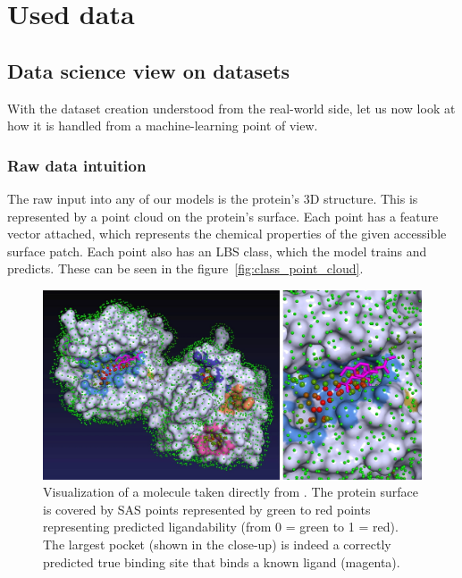 \chapter{Used data}

\section{Data science view on datasets}

With the dataset creation understood from the real-world side, let us now look at how it is handled from a machine-learning point of view. 

\subsection{Raw data intuition}

The raw input into any of our models is the protein's 3D structure. This is represented by a point cloud on the protein's surface. Each point has a feature vector attached, which represents the chemical properties of the given accessible surface patch. Each point also has an LBS class, which the model trains and predicts. These can be seen in the figure~\ref{fig:class_point_cloud}.

\begin{figure}
    \centering
    \includegraphics[width=1\linewidth]{p2rank.jpg}
    \caption{Visualization of a molecule taken directly from \cite{P2RANK}. The protein surface is covered by SAS points represented by green to red points representing predicted ligandability  (from 0 = green to 1 = red). The largest pocket (shown in the close-up) is indeed a correctly predicted true binding site that binds a known ligand (magenta). }
    \label{fig:p2rank_visualization}
\end{figure}

